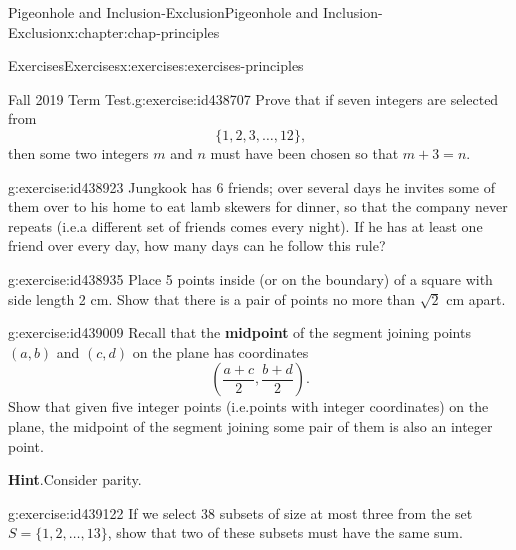\documentclass[oneside,10pt,]{book}
\newcommand{\blocktitlefont}{\relax}
\newcommand{\terminology}[1]{\textbf{#1}}
\numberwithin{equation}{section}
\begin{document}
\begin{chapterptx}{Pigeonhole and Inclusion-Exclusion}{}{Pigeonhole and Inclusion-Exclusion}{}{}{x:chapter:chap-principles}
\begin{exercises-section}{Exercises}{}{Exercises}{}{}{x:exercises:exercises-principles}
\begin{divisionexercise}{4}{Fall 2019 Term Test.}{}{g:exercise:id438707}
Prove that if seven integers are selected from%
\begin{equation*}
\{1,2,3,\ldots,12\}\text{,}
\end{equation*}
then some two integers \(m\) and \(n\) must have been chosen so that \(m + 3 = n\).%
\end{divisionexercise}%
\begin{divisionexercise}{5}{}{}{g:exercise:id438923}%
Jungkook has 6 friends; over several days he invites some of them over to his home to eat lamb skewers for dinner, so that the company never repeats (i.e.\@ a different set of friends comes every night). If he has at least one friend over every day, how many days can he follow this rule?%
\par
%
\end{divisionexercise}%
\begin{divisionexercise}{6}{}{}{g:exercise:id438935}%
Place 5 points inside (or on the boundary) of a square with side length 2 cm. Show that there is a pair of points no more than \(\sqrt{2}\) cm apart.%
\begin{sidebyside}{1}{0.425}{0.425}{0}%
\begin{sbspanel}{0.15}%
%
\end{sbspanel}%
\end{sidebyside}%
\end{divisionexercise}%
\begin{divisionexercise}{7}{}{}{g:exercise:id439009}%
Recall that the \terminology{midpoint} of the segment joining points \((a,b)\) and \((c,d)\) on the plane has coordinates%
\begin{equation*}
\left(\frac{a+c}{2},\frac{b+d}{2}\right)\text{.}
\end{equation*}
Show that given five integer points (i.e.\@ points with integer coordinates) on the plane, the midpoint of the segment joining some pair of them is also an integer point.%
\par\smallskip%
\noindent\textbf{\blocktitlefont Hint}.\hypertarget{g:hint:id439117}{}\quad{}Consider parity.%
\end{divisionexercise}%
\begin{divisionexercise}{8}{}{}{g:exercise:id439122}%
If we select 38 subsets of size at most three from the set \(S = \{1,2,\ldots,13\}\), show that two of these subsets must have the same sum.%

\end{divisionexercise}
\end{exercises-section}
\end{chapterptx}
\end{document}
